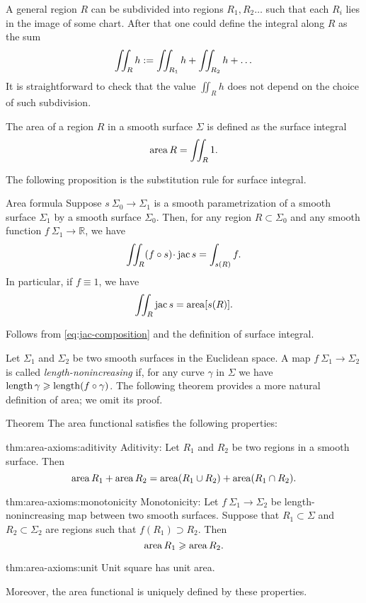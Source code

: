 A general region $R$ can be subdivided into regions $R_1,R_2\dots$ such that each $R_i$ lies in the image of some chart.
After that one could define the integral along $R$ as the sum
\[\iint_Rh
\mathrel{:=}
\iint_{R_1}h+\iint_{R_2}h+\dots\]
It is straightforward to check that the value $\iint_Rh$ does not depend on the choice of such subdivision.

The area of a region $R$ in a smooth surface $\Sigma$ is defined as the surface integral 
\[\mathop{\rm area}\nolimits R=\iint_R 1.\]

The following proposition is the substitution rule for surface integral.

\begin{thm}{Area formula}\label{prop:surface-integral}
Suppose $s\:\Sigma_0\to \Sigma_1$ is a smooth parametrization of a smooth surface $\Sigma_1$ by  a smooth surface $\Sigma_0$.
Then, for any region $R\subset \Sigma_0$ and any smooth function $f\:\Sigma_1\to\mathbb{R}$, we have
\[\iint_R (f\circ s)\cdot \jac  s=\int_{s(R)}f.\]
In particular, if $f\equiv 1$, we have
\[\iint_R \mathop{\rm jac}\nolimits  s=\mathop{\rm area}\nolimits [s(R)].\]

\end{thm}

Follows from \ref{eq:jac-composition} and the definition of surface integral.
\qeds

Let $\Sigma_1$ and $\Sigma_2$ be two smooth surfaces in the Euclidean space.
A map $f\:\Sigma_1\to \Sigma_2$ is called \emph{length-nonincreasing} if, for any curve $\gamma$ in $\Sigma$ we have $\mathop{\rm length}\nolimits\gamma\geqslant \mathop{\rm length}\nolimits (f\circ\gamma)$. 
The following theorem provides a more natural definition of area; we omit its proof.

\begin{thm}{Theorem}\label{thm:area-axioms}
The area functional satisfies the following properties:

\begin{subthm}{thm:area-axioms:aditivity}
Aditivity: 
Let $R_1$ and $R_2$ be two regions in a smooth surface.
Then 
\[\mathop{\rm area}\nolimits R_1+ \mathop{\rm area}\nolimits R_2=\mathop{\rm area}\nolimits (R_1\cup R_2)+ \mathop{\rm area}\nolimits (R_1\cap R_2).\]
\end{subthm}

\begin{subthm}{thm:area-axioms:monotonicity}
Monotonicity:
Let $f\:\Sigma_1\to \Sigma_2$ be length-nonincreasing map between two smooth surfaces.
Suppose that $R_1\subset \Sigma$ and $R_2\subset \Sigma_2$ are regions such that $f(R_1)\supset R_2$.
Then 
\[\mathop{\rm area}\nolimits R_1\geqslant \mathop{\rm area}\nolimits R_2.\]
\end{subthm}

\begin{subthm}{thm:area-axioms:unit}
Unit square has unit area. 
\end{subthm}

Moreover, the area functional is uniquely defined by these properties.
\end{thm}

